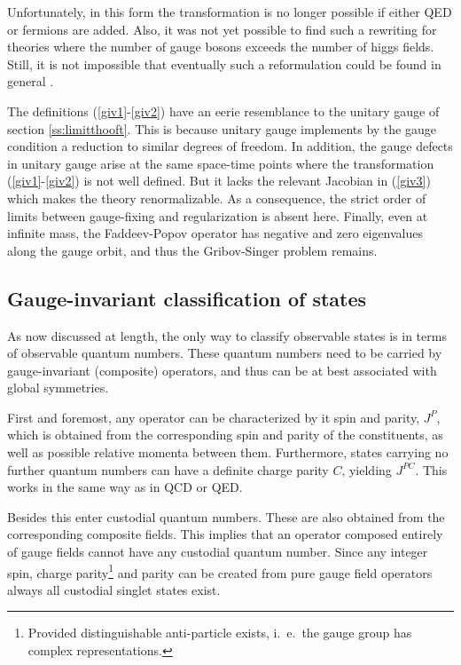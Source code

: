 \documentclass[final,12pt]{article}
\newcommand*{\pref}[1]{(\ref{#1})}
\newcommand*{\prefr}[2]{(\ref{#1}-\ref{#2})}
\newcommand*{\1}{1\!\!\!\bot}
\begin{document}
Unfortunately, in this form the transformation is no longer possible if either QED or fermions are added. Also, it was not yet possible to find such a rewriting for theories where the number of gauge bosons exceeds the number of higgs fields. Still, it is not impossible that eventually such a reformulation could be found in general \cite{Attard:2017sdn,Kondo:2018qus}. 

The definitions \prefr{giv1}{giv2} have an eerie resemblance to the unitary gauge of section \ref{ss:limitthooft}. This is because unitary gauge implements by the gauge condition a reduction to similar degrees of freedom. In addition, the gauge defects in unitary gauge arise at the same space-time points where the transformation \prefr{giv1}{giv2} is not well defined. But it lacks the relevant Jacobian in \pref{giv3} which makes the theory renormalizable. As a consequence, the strict order of limits between gauge-fixing and regularization is absent here. Finally, even at infinite mass, the Faddeev-Popov operator has negative and zero eigenvalues along the gauge orbit, and thus the Gribov-Singer problem remains.

\subsection{Gauge-invariant classification of states}\label{ss:classification}

As now discussed at length, the only way to classify observable states is in terms of observable quantum numbers. These quantum numbers need to be carried by gauge-invariant (composite) operators, and thus can be at best associated with global symmetries.

First and foremost, any operator can be characterized by it spin and parity, $J^P$, which is obtained from the corresponding spin and parity of the constituents, as well as possible relative momenta between them. Furthermore, states carrying no further quantum numbers can have a definite charge parity $C$, yielding $J^{PC}$. This works in the same way as in QCD or QED.

Besides this enter custodial quantum numbers. These are also obtained from the corresponding composite fields. This implies that an operator composed entirely of gauge fields cannot have any custodial quantum number. Since any integer spin, charge parity\footnote{Provided distinguishable anti-particle exists, i.\ e.\ the gauge group has complex representations.} and parity can be created from pure gauge field operators \cite{Chen:2005mg} always all custodial singlet states exist.
\end{document}
